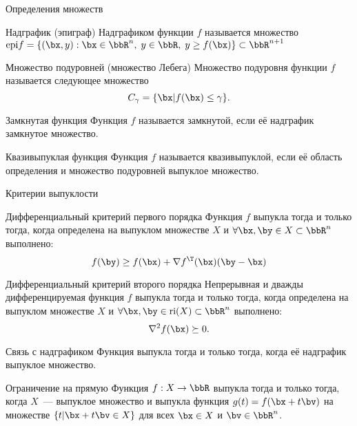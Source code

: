 \documentclass[12pt,russian]{beamer}
\begin{document}
\begin{frame}{Определения множеств}
\footnotesize
\begin{block}{Надграфик (эпиграф)}
Надграфиком функции $f$ называется множество $\text{epi}f = \{ (\bx, y) : \bx \in \bbR^n, \; y \in \bbR, \; y \geq f(\bx) \} \subset \bbR^{n+1}$
\end{block}

\begin{block}{Множество подуровней (множество Лебега)}
Множество подуровня функции $f$ называется следующее множество
\vspace{-4mm}
\[
C_{\gamma} = \{ \bx | f(\bx) \leq \gamma \}.
\]
\end{block}

\begin{block}{Замкнутая функция}
Функция $f$ называется замкнутой, если её надграфик замкнутое множество. 
\end{block}

\begin{block}{Квазивыпуклая функция}
Функция $f$ называется квазивыпуклой, если её область определения и множество подуровней выпуклое множество. 
\end{block}
\end{frame}

\begin{frame}{Критерии выпуклости}
\scriptsize
\begin{block}{Дифференциальный критерий первого порядка}
Функция $f$ выпукла тогда и только тогда, когда определена на выпуклом множестве $X$ и $\forall \bx, \by \in X \subset \bbR^n$ выполнено:
\vspace{-4mm}
\[
f(\by) \geq f(\bx) + \nabla f^{\T}(\bx)(\by - \bx)
\]
\end{block}

\begin{block}{Дифференциальный критерий второго порядка}
Непрерывная и дважды дифференцируемая функция $f$ выпукла тогда и только тогда, когда определена на выпуклом множестве $X$ и $\forall \bx, \by \in \text{ri}(X) \subset \bbR^n$ выполнено:
\vspace{-2mm}
\[
\nabla^2 f(\bx) \succeq 0.
\]
\end{block}

\begin{block}{Связь с надграфиком}
Функция выпукла тогда и только тогда, когда её надграфик выпуклое множество.
\end{block}

\begin{block}{Ограничение на прямую}
Функция $f: X \rightarrow \bbR$ выпукла тогда и только тогда, когда $X$~--- выпуклое множество и выпукла функция $g(t) = f(\bx + t\bv)$ на множестве $\{ t | \bx + t\bv \in X \}$ для всех $\bx \in X$ и $\bv \in \bbR^n$.
\end{block}

\end{frame}
\end{document}
